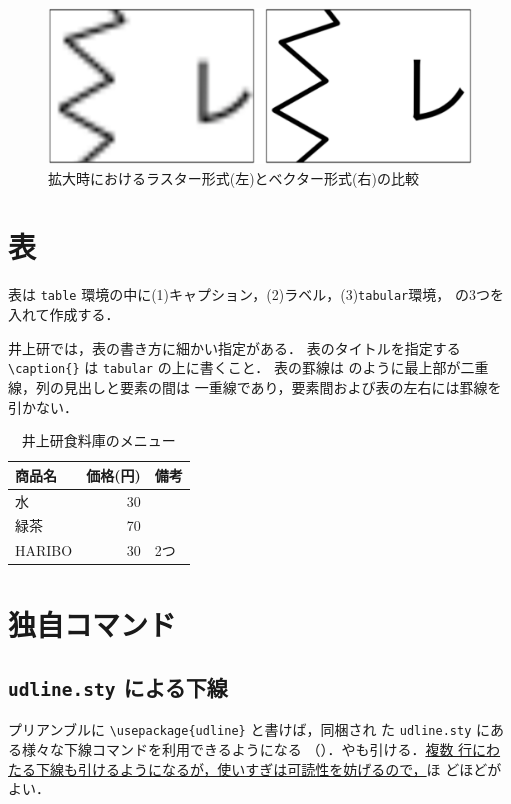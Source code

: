 \documentclass[uplatex]{jsarticle}
\begin{document}
\begin{figure}[tb]
  \centering
  \includegraphics[width=0.6\linewidth]{fig/compare.pdf}
  \caption{拡大時におけるラスター形式(左)とベクター形式(右)の比較}
  \label{fig:compare}
\end{figure}

\section{表}

表は \verb|table| 環境の中に(1)キャプション，(2)ラベル，(3)\verb|tabular|環境，
の3つを入れて作成する．

井上研では，表の書き方に細かい指定がある．
表のタイトルを指定する \verb|\caption{}| は \texttt{tabular} の上に書くこと．
表の罫線は  のように最上部が二重線，列の見出しと要素の間は
一重線であり，要素間および表の左右には罫線を引かない．

\begin{table}[b]
  \centering
  \footnotesize
  \caption{井上研食料庫のメニュー}
  \label{tab:menu}
  \begin{tabular}[h]{l|r|l}
    \hline
    \hline
    商品名 & 価格(円) & 備考 \\
    \hline
    水 & 30 & \\
    緑茶 & 70 & \\
    HARIBO & 30 & 2つ\\
    \hline
  \end{tabular}
\end{table}

\section{独自コマンド}

\subsection{ \texttt{udline.sty} による下線}

プリアンブルに \verb|\usepackage{udline}| と書けば，同梱され
た \texttt{udline.sty} にある様々な下線コマンドを利用できるようになる
（）．やも引ける．\ul{複数
  行にわたる下線も引けるようになるが，使いすぎは可読性を妨げるので，}ほ
どほどがよい．
\end{document}
